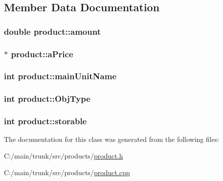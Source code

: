 \subsection{Member Data Documentation}
\hypertarget{classproduct_aa3df4db37dfee2a7585a75456c3c361e}{
\subsubsection[{amount}]{\setlength{\rightskip}{0pt plus 5cm}double {\bf product::amount}}}
\label{classproduct_aa3df4db37dfee2a7585a75456c3c361e}
\hypertarget{classproduct_a43ad5c9b57fae8134ea527657068b0b6}{
\subsubsection[{aPrice}]{$\ast$ {\bf product::aPrice}}}
\label{classproduct_a43ad5c9b57fae8134ea527657068b0b6}
\hypertarget{classproduct_a9627fb5e337066fba10f12d24db748a2}{
\subsubsection[{mainUnitName}]{\setlength{\rightskip}{0pt plus 5cm}int {\bf product::mainUnitName}}}
\label{classproduct_a9627fb5e337066fba10f12d24db748a2}
\hypertarget{classproduct_ae0b4ae3c238d363f60f145b7dc40804c}{
\subsubsection[{ObjType}]{\setlength{\rightskip}{0pt plus 5cm}int {\bf product::ObjType}}}
\label{classproduct_ae0b4ae3c238d363f60f145b7dc40804c}
\hypertarget{classproduct_af3ced9f7b34320431388728959fc8a18}{
\subsubsection[{storable}]{\setlength{\rightskip}{0pt plus 5cm}int {\bf product::storable}}}
\label{classproduct_af3ced9f7b34320431388728959fc8a18}


The documentation for this class was generated from the following files:\begin{DoxyCompactItemize}
\item 
C:/main/trunk/src/products/\hyperlink{product_8h}{product.h}\item 
C:/main/trunk/src/products/\hyperlink{product_8cpp}{product.cpp}\end{DoxyCompactItemize}
